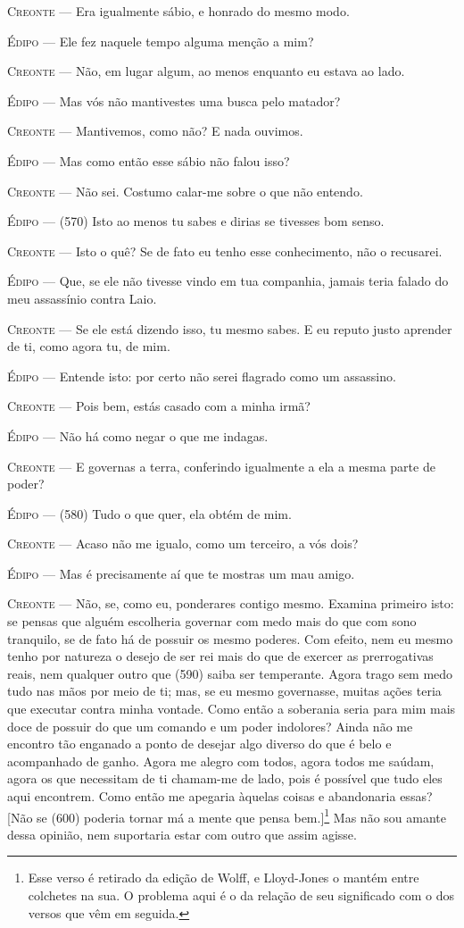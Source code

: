 \textsc{Creonte} --- Era igualmente sábio, e honrado do mesmo modo.

\textsc{Édipo} --- Ele fez naquele tempo alguma menção a mim?

\textsc{Creonte} --- Não, em lugar algum, ao menos enquanto eu estava ao lado.

\textsc{Édipo} --- Mas vós não mantivestes uma busca pelo matador?

\textsc{Creonte} --- Mantivemos, como não? E nada ouvimos.

\textsc{Édipo} --- Mas como então esse sábio não falou isso?

\textsc{Creonte} --- Não sei. Costumo calar-me sobre o que não entendo.

\textsc{Édipo} --- (570) Isto ao menos tu sabes e dirias se tivesses bom senso.

\textsc{Creonte} --- Isto o quê? Se de fato eu tenho esse conhecimento, não o recusarei.

\textsc{Édipo} --- Que, se ele não tivesse vindo em tua companhia, jamais teria falado do
meu assassínio contra Laio.

\textsc{Creonte} --- Se ele está dizendo isso, tu mesmo sabes. E eu reputo justo aprender de
ti, como agora tu, de mim.

\textsc{Édipo} --- Entende isto: por certo não serei flagrado como um assassino.

\textsc{Creonte} --- Pois bem, estás casado com a minha irmã?

\textsc{Édipo} --- Não há como negar o que me indagas.

\textsc{Creonte} --- E governas a terra, conferindo igualmente a ela a mesma parte de poder?

\textsc{Édipo} --- (580) Tudo o que quer, ela obtém de mim.

\textsc{Creonte} --- Acaso não me igualo, como um terceiro, a vós dois?

\textsc{Édipo} --- Mas é precisamente aí que te mostras um mau amigo.

\textsc{Creonte} --- Não, se, como eu, ponderares contigo mesmo. Examina primeiro isto: se
pensas que alguém escolheria governar com medo mais do que com sono
tranquilo, se de fato há de possuir os mesmo poderes. Com efeito, nem eu
mesmo tenho por natureza o desejo de ser rei mais do que de exercer as
prerrogativas reais, nem qualquer outro que (590) saiba ser temperante.
Agora trago sem medo tudo nas mãos por meio de ti; mas, se eu mesmo
governasse, muitas ações teria que executar contra minha vontade. Como
então a soberania seria para mim mais doce de possuir do que um comando
e um poder indolores? Ainda não me encontro tão enganado a ponto de
desejar algo diverso do que é belo e acompanhado de ganho. Agora me
alegro com todos, agora todos me saúdam, agora os que necessitam de ti
chamam-me de lado, pois é possível que tudo eles aqui encontrem. Como
então me apegaria àquelas coisas e abandonaria essas? {[}Não se (600)
poderia tornar má a mente que pensa bem.{]}\footnote{Esse verso é
  retirado da edição de Wolff, e Lloyd-Jones o mantém entre colchetes na
  sua. O problema aqui é o da relação de seu significado com o dos
  versos que vêm em seguida.} Mas não sou amante dessa opinião, nem
suportaria estar com outro que assim agisse.

